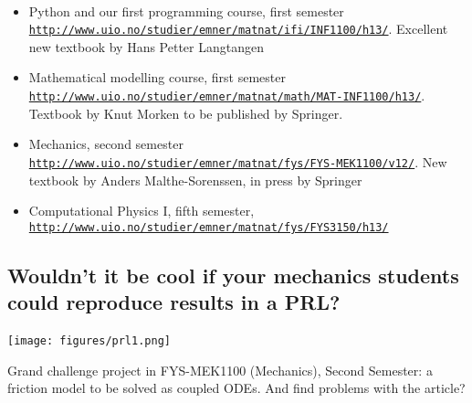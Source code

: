 \documentclass[%
twoside,                 %
final,                   %
10pt]{article}
\begin{document}
\paragraph{}
\begin{itemize}
\item Python and our first programming course, first semester \href{{http://www.uio.no/studier/emner/matnat/ifi/INF1100/h13/}}{\nolinkurl{http://www.uio.no/studier/emner/matnat/ifi/INF1100/h13/}}. Excellent new textbook by Hans Petter Langtangen

\item Mathematical modelling course, first semester \href{{http://www.uio.no/studier/emner/matnat/math/MAT-INF1100/h13/}}{\nolinkurl{http://www.uio.no/studier/emner/matnat/math/MAT-INF1100/h13/}}. Textbook by Knut Morken to be published by Springer.

\item Mechanics, second semester \href{{http://www.uio.no/studier/emner/matnat/fys/FYS-MEK1100/v12/}}{\nolinkurl{http://www.uio.no/studier/emner/matnat/fys/FYS-MEK1100/v12/}}. New textbook by Anders Malthe-Sorenssen, in press by Springer

\item Computational Physics I, fifth semester, \href{{http://www.uio.no/studier/emner/matnat/fys/FYS3150/h13/}}{\nolinkurl{http://www.uio.no/studier/emner/matnat/fys/FYS3150/h13/}}
\end{itemize}

\noindent





\subsection{Wouldn't it be cool if your mechanics students could reproduce results in a PRL?}

\paragraph{}


\centerline{\texttt{[image: figures/prl1.png]}}



Grand challenge project in FYS-MEK1100 (Mechanics), Second Semester: a friction model to be solved as coupled ODEs. And find problems with the article?
\end{document}
